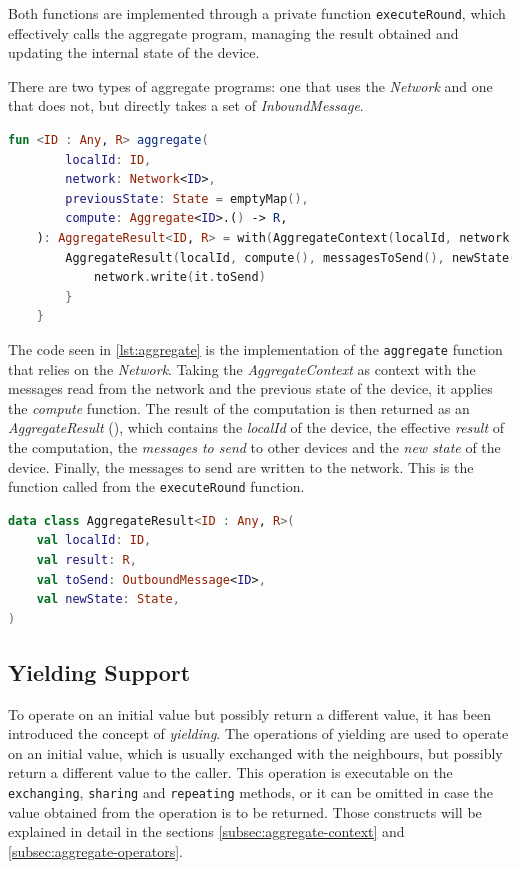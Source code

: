 Both functions are implemented through a private function \texttt{executeRound}, which effectively calls the aggregate program,
managing the result obtained and updating the internal state of the device.

There are two types of aggregate programs: one that uses the \emph{Network} and one that does not, but directly takes
a set of \emph{InboundMessage}.

\begin{lstlisting}[language=kt,label={lst:aggregate}, caption={The signature of the \texttt{aggregate program}.}]
fun <ID : Any, R> aggregate(
        localId: ID,
        network: Network<ID>,
        previousState: State = emptyMap(),
        compute: Aggregate<ID>.() -> R,
    ): AggregateResult<ID, R> = with(AggregateContext(localId, network.read(), previousState)) {
        AggregateResult(localId, compute(), messagesToSend(), newState()).also {
            network.write(it.toSend)
        }
    }
\end{lstlisting}

The code seen in \ref{lst:aggregate} is the implementation of the \texttt{aggregate} function that relies on the \emph{Network}.
Taking the \emph{AggregateContext} as context with the messages read from the network and the previous state of the
device, it applies the \emph{compute} function.
The result of the computation is then returned as an \emph{AggregateResult} (), which contains the \emph{localId} of the device,
the effective \emph{result} of the computation, the \emph{messages to send} to other devices and the \emph{new state} of the device.
Finally, the messages to send are written to the network.
This is the function called from the \texttt{executeRound} function.

\begin{lstlisting}[language=kt,label={lst:aggregateresult}, caption={The signature of the \texttt{aggregate result}.}]
data class AggregateResult<ID : Any, R>(
    val localId: ID,
    val result: R,
    val toSend: OutboundMessage<ID>,
    val newState: State,
)
\end{lstlisting}

\subsection{Yielding Support}
\label{subsec:yielding-support}
To operate on an initial value but possibly return a different value, it has been introduced
the concept of \emph{yielding}.
The operations of yielding are used to operate on an initial value, which is usually exchanged with the neighbours,
but possibly return a different value to the caller.
This operation is executable on the \texttt{exchanging}, \texttt{sharing} and \texttt{repeating} methods, or it can be omitted
in case the value obtained from the operation is to be returned.
Those constructs will be explained in detail in the sections \ref{subsec:aggregate-context} and \ref{subsec:aggregate-operators}.

